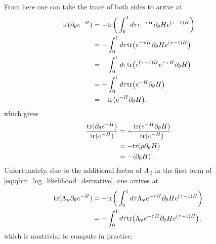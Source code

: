 From here one can take the trace of both sides to arrive at
\begin{align}
\begin{split}
    \text{tr}(\partial_\theta e^{-H})
        &= -\text{tr}\bigg( \int_{0}^{1} d\tau e^{-\tau H} \partial_\theta H e^{(\tau-1)H} \bigg) \\
        &= -\int_{0}^{1} d\tau \text{tr}\big(e^{-\tau H} \partial_\theta H e^{(\tau-1)H} \big) \\
        &= -\int_{0}^{1} d\tau \text{tr}\big(e^{(\tau-1)H} e^{-\tau H} \partial_\theta H \big) \\
        &= -\int_{0}^{1} d\tau \text{tr}\big(e^{-H} \partial_\theta H \big) \\
        &= -\text{tr}\big(e^{-H} \partial_\theta H \big),
\end{split}
\end{align}
which gives
\begin{align}
\begin{split}
    \frac{\text{tr}(\partial_\theta e^{-H})}{\text{tr}(e^{-H})}
        &= -\frac{\text{tr}(e^{-H} \partial_\theta H)}{\text{tr}(e^{-H})} \\
        &= -\text{tr}(\rho \partial_\theta H) \\
        &= -\langle \partial_\theta H \rangle.
\end{split}
\end{align}
Unfortunately, due to the additional factor of \( \Lambda_\vec{v} \) in the first term of \cref{eq:qbm_log_likelihood_derivative}, one arrives at
\begin{align}
\begin{split}
    \text{tr}(\Lambda_{\mathbf{v}} \partial_\theta e^{-H})
        &= -\text{tr}\bigg( \int_{0}^{1} d\tau \Lambda_{\mathbf{v}} e^{-\tau H} \partial_\theta H e^{(\tau-1)H} \bigg) \\
        &= -\int_{0}^{1} d\tau \text{tr}\big(\Lambda_{\mathbf{v}} e^{-\tau H} \partial_\theta H e^{(\tau-1)H} \big),
\end{split}
\end{align}
which is nontrivial to compute in practice.

